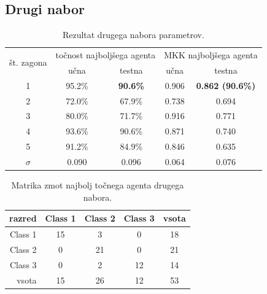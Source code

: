 \subsection{Drugi nabor}\label{subsec:dodatek-wine-drugi-nabor}
\begin{table}[H]
    \begin{center}
        \begin{tabular}{|| c | c c || c c ||}
            \hline
            \multirow{2}{*}{št. zagona} & \multicolumn{2}{c||}{točnost najboljšega agenta} & \multicolumn{2}{c||}{MKK najboljšega agenta} \\ \cline{2-5}
            & učna   & testna          & učna  & testna                  \\
            \hline
            1        & 95.2\% & \textbf{90.6\%} & 0.906 & \textbf{0.862 (90.6\%)} \\
            \hline
            2        & 72.0\% & 67.9\%          & 0.738 & 0.694                   \\
            \hline
            3        & 80.0\% & 71.7\%          & 0.916 & 0.771                   \\
            \hline
            4        & 93.6\% & 90.6\%          & 0.871 & 0.740                   \\
            \hline
            5        & 91.2\% & 84.9\%          & 0.846 & 0.635                   \\
            \hline
            $\sigma$ & 0.090  & 0.096           & 0.064 & 0.076                   \\
            \hline
        \end{tabular}
    \end{center}
    \caption{Rezultat drugega nabora parametrov.}
    \label{tab:wine_result_2}
\end{table}

\begin{table}[H]
    \centering
    \begin{tabular}{||rcccc||}
        \hline
        razred  & Class 1 & Class 2 & Class 3 & vsota \\ \hline
        Class 1 & 15      & 3       & 0       & 18    \\ \hline
        Class 2 & 0       & 21      & 0       & 21    \\ \hline
        Class 3 & 0       & 2       & 12      & 14    \\ \hline
        vsota   & 15      & 26      & 12      & 53    \\ \hline
    \end{tabular}
    \caption{Matrika zmot najbolj točnega agenta drugega nabora.}
    \label{tab:wine_acc_2}
\end{table}

